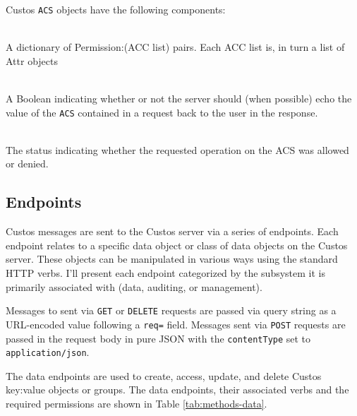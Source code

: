\noindent
Custos \texttt{ACS} objects have the following components:

\begin{packed_desc}
\item[\texttt{Permissions}] \hfill \\ A dictionary of Permission:(ACC
  list) pairs. Each ACC list is, in turn a list of Attr objects
\item[\texttt{Echo}] \hfill \\ A Boolean indicating whether or not the
  server should (when possible) echo the value of the \texttt{ACS}
  contained in a request back to the user in the response.
\item[\texttt{Status} (Response Only)] \hfill \\ The status indicating
  whether the requested operation on the ACS was allowed or denied.
\end{packed_desc}

\subsection{Endpoints}

Custos messages are sent to the Custos server via a series of
endpoints. Each endpoint relates to a specific data object or class
of data objects on the Custos server. These objects can be manipulated
in various ways using the standard HTTP verbs. I'll present each
endpoint categorized by the subsystem it is primarily associated with
(data, auditing, or management).

Messages to sent via \texttt{GET} or \texttt{DELETE} requests are
passed via query string as a URL-encoded value following a
\texttt{req=} field. Messages sent via \texttt{POST} requests are
passed in the request body in pure JSON with the \texttt{contentType}
set to \texttt{application/json}.

The data endpoints are used to create, access, update, and delete
Custos key:value objects or groups. The data endpoints, their
associated verbs and the required permissions are shown in Table
\ref{tab:methods-data}.

